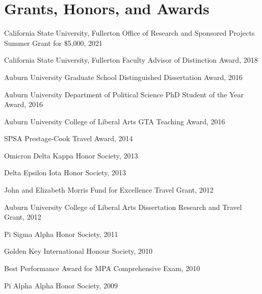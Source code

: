 \documentclass[11pt,letterpaper]{article}
\renewenvironment{itemize}{
  \begin{list}{}{
    \setlength{\leftmargin}{1.5em}
    \setlength{\itemsep}{0.25em}
    \setlength{\parskip}{0pt}
    \setlength{\parsep}{0.25em}
  }
}{
  \end{list}
}
\begin{document}
\section*{Grants, Honors, and Awards}
\begin{itemize}
	\item California State University, Fullerton Office of Research and Sponsored Projects Summer Grant for \$5,000, 2021
	\item California State University, Fullerton Faculty Advisor of Distinction Award, 2018
	\item Auburn University Graduate School Distinguished Dissertation Award, 2016
	\item Auburn University Department of Political Science PhD Student of the Year Award, 2016
	\item Auburn University College of Liberal Arts GTA Teaching Award, 2016
	\item SPSA Prestage-Cook Travel Award, 2014
	\item Omicron Delta Kappa Honor Society, 2013
	\item Delta Epsilon Iota Honor Society, 2013
	\item John and Elizabeth Morris Fund for Excellence Travel Grant, 2012
	\item Auburn University College of Liberal Arts Dissertation Research and Travel Grant, 2012
	\item Pi Sigma Alpha Honor Society, 2011
	\item Golden Key International Honour Society, 2010
	\item Best Performance Award for MPA Comprehensive Exam, 2010
	\item Pi Alpha Alpha Honor Society, 2009
\end{itemize}
\end{document}
